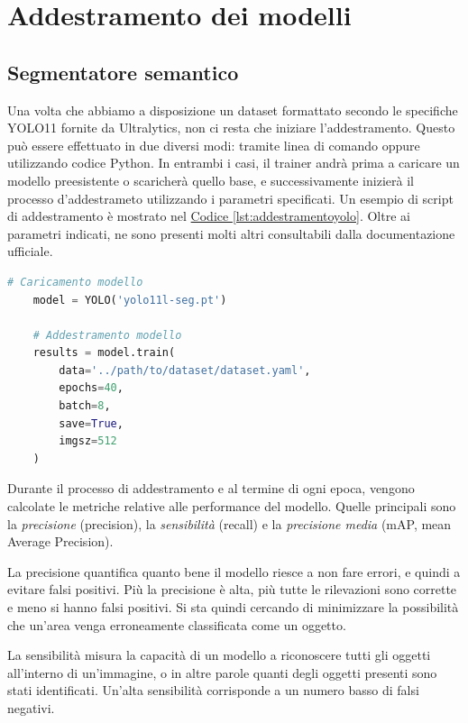 \documentclass[12pt]{report}
\begin{document}
\section{Addestramento dei modelli}
\label{sec:addestramento_dei modelli}

\subsection{Segmentatore semantico}
\label{sec:addestramento_segmentatore_semantico}

Una volta che abbiamo a disposizione un dataset formattato secondo le specifiche YOLO11 fornite da Ultralytics, non ci resta che iniziare l'addestramento. Questo può essere effettuato in due diversi modi: tramite linea di comando oppure utilizzando codice Python. In entrambi i casi, il trainer andrà prima a caricare un modello preesistente o scaricherà quello base, e successivamente inizierà il processo d'addestrameto utilizzando i parametri specificati. Un esempio di script di addestramento è mostrato nel \hyperref[lst:addestramentoyolo]{Codice \ref{lst:addestramentoyolo}}. Oltre ai parametri indicati, ne sono presenti molti altri consultabili dalla documentazione ufficiale.

\lstset{style=pythonstyle}
\begin{lstlisting}[language=Python, caption={Addestramento del modello YOLO11.}, label={lst:addestramentoyolo}, float]
	# Caricamento modello
	model = YOLO('yolo11l-seg.pt')
	
	# Addestramento modello
	results = model.train(
		data='../path/to/dataset/dataset.yaml',
		epochs=40,
		batch=8,
		save=True,
		imgsz=512
	)
\end{lstlisting}

Durante il processo di addestramento e al termine di ogni epoca, vengono calcolate le metriche relative alle performance del modello. Quelle principali sono la \textit{precisione} (precision), la \textit{sensibilità} (recall) e la \textit{precisione media} (mAP, mean Average Precision).

La precisione quantifica quanto bene il modello riesce a non fare errori, e quindi a evitare falsi positivi. Più la precisione è alta, più tutte le rilevazioni sono corrette e meno si hanno falsi positivi. Si sta quindi cercando di minimizzare la possibilità che un'area venga erroneamente classificata come un oggetto.

La sensibilità misura la capacità di un modello a riconoscere tutti gli oggetti all'interno di un'immagine, o in altre parole quanti degli oggetti presenti sono stati identificati. Un'alta sensibilità corrisponde a un numero basso di falsi negativi.
\end{document}
